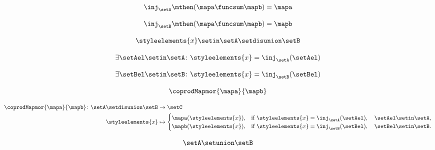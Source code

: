 \begin{forslides}
    \begin{equation}
        \label{eq:systems-101}
        \inj_\setA\mthen (\mapa \funcsum \mapb)=\mapa
    \end{equation}

    \begin{equation}
        \label{eq:systems-102}
        \inj_\setB\mthen (\mapa \funcsum \mapb)=\mapb
    \end{equation}

    \begin{equation}
        \label{eq:systems-103}
        \styleelements{x}\setin \setA \setdisunion \setB
    \end{equation}

    \begin{equation}
        \label{eq:systems-104}
        \exists \setAel\setin \setA\colon \styleelements{x}=\inj_\setA(\setAel)
    \end{equation}

    \begin{equation}
        \label{eq:systems-105}
        \exists \setBel\setin \setB\colon \styleelements{x}=\inj_\setB(\setBel)
    \end{equation}

    \begin{equation}
        \label{eq:systems-106}
        \coprodMapmor{\mapa}{\mapb}
    \end{equation}

    \begin{equation}
        \label{eq:systems-107}
        \begin{aligned}
            \coprodMapmor{\mapa}{\mapb} \colon  \setA \setdisunion \setB & \to \setC \\
            \styleelements{x}                                            & \mapsto
            \begin{cases}
                \mapa(\styleelements{x}), & \text{if } \styleelements{x}=\inj_\setA(\setAel),\quad \setAel \setin \setA, \\
                \mapb(\styleelements{x}), & \text{if } \styleelements{x}=\inj_\setB(\setBel),\quad \setBel \setin \setB.
            \end{cases}
        \end{aligned}
    \end{equation}

    \begin{equation}
        \label{eq:systems-108}
        \setA\setunion \setB
    \end{equation}


\end{forslides}
